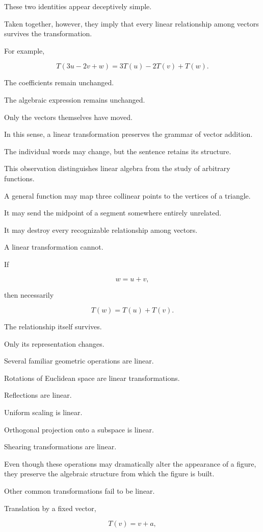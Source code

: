 \documentclass[11pt]{book}
\numberwithin{equation}{chapter}
\theoremstyle{definition}
\theoremstyle{plain}
\theoremstyle{remark}
\begin{document}
These two identities appear deceptively simple.

Taken together, however, they imply that every linear relationship among vectors survives the transformation.

For example,

\[
T(3u-2v+w)
=
3T(u)-2T(v)+T(w).
\]

The coefficients remain unchanged.

The algebraic expression remains unchanged.

Only the vectors themselves have moved.

In this sense, a linear transformation preserves the grammar of vector addition.

The individual words may change, but the sentence retains its structure.

This observation distinguishes linear algebra from the study of arbitrary functions.

A general function may map three collinear points to the vertices of a triangle.

It may send the midpoint of a segment somewhere entirely unrelated.

It may destroy every recognizable relationship among vectors.

A linear transformation cannot.

If

\[
w=u+v,
\]

then necessarily

\[
T(w)=T(u)+T(v).
\]

The relationship itself survives.

Only its representation changes.

Several familiar geometric operations are linear.

Rotations of Euclidean space are linear transformations.

Reflections are linear.

Uniform scaling is linear.

Orthogonal projection onto a subspace is linear.

Shearing transformations are linear.

Even though these operations may dramatically alter the appearance of a figure, they preserve the algebraic structure from which the figure is built.

Other common transformations fail to be linear.

Translation by a fixed vector,

\[
T(v)=v+a,
\]
\end{document}
